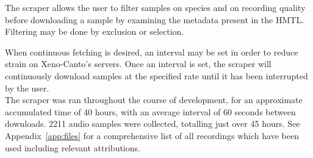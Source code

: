 The scraper allows the user to filter samples on species and on recording quality
before downloading a sample by examining the metadata present in the HMTL.
Filtering may be done by exclusion or selection.

When continuous fetching is desired, an interval may be set in order to reduce
strain on Xeno-Canto's servers.
Once an interval is set, the scraper will continuously download samples
at the specified rate until it has been interrupted by the user.\\

The scraper was ran throughout the course of development, for an approximate
accumulated time of 40 hours, with an average interval of 60 seconds between
downloads.
2211 audio samples were collected, totalling just over 45 hours.
See Appendix~\ref{app:files} for a comprehensive list of all recordings which
have been used including relevant attributions.
